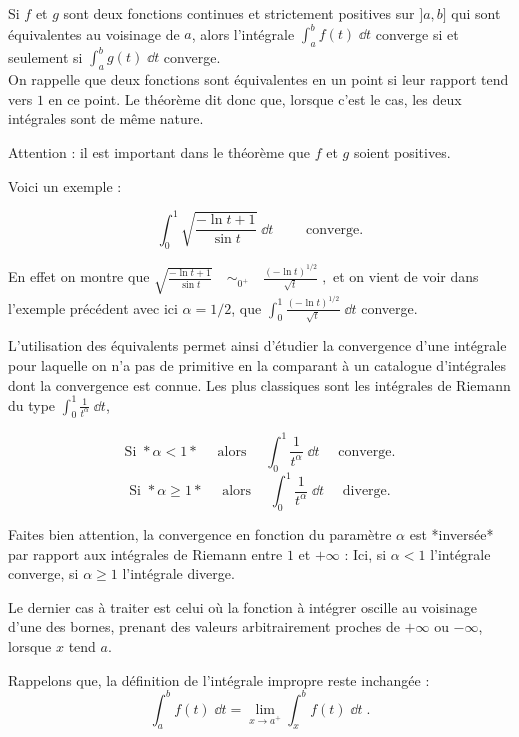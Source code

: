 Si $f$ et $g$ sont deux fonctions continues et strictement positives sur
$]a,b]$ qui sont équivalentes au voisinage de $a$, 
alors l'intégrale $\int_a^b f(t)\;\dd t$ 
converge si et seulement si  $\int_a^b g(t)\;\dd t$ converge. \\

On rappelle que deux fonctions sont équivalentes 
en un point si leur rapport tend vers $1$ en ce point.
Le théorème dit donc que, lorsque c'est le cas, les deux intégrales sont de même nature.

Attention : il est important dans le théorème 
que $f$ et $g$ soient positives.

\change
Voici un exemple :

$$\int_0^1 \sqrt{\frac{-\ln t+1}{\sin t}}\;\dd t\qquad\text{ converge.}$$

\change
En effet on montre que 
$\sqrt{\frac{-\ln t+1}{\sin t}} \quad\mathop{\sim}_{0^+}\quad
\frac{(-\ln t)^{1/2}}{\sqrt{t}}\;,$ 
et on vient de voir dans l'exemple précédent avec ici $\alpha=1/2$,
que 
$\int_0^1 \frac{(-\ln t)^{1/2}}{\sqrt{t}}\;\dd t$ converge.   


\diapo

L'utilisation des équivalents permet ainsi d'étudier la convergence d'une intégrale 
pour laquelle on n'a pas de primitive en la comparant à un catalogue d'intégrales 
dont la convergence est connue. Les plus classiques sont les intégrales de Riemann 
du type $\int_0^1 \frac{1}{t^\alpha}\;\dd t$, 

$$\text{Si } *\alpha < 1* \quad \text{ alors } \quad \int_0^1 \frac{1}{t^\alpha}\;\dd t
\quad\text{ converge.}$$
$$\text{Si } *\alpha \ge 1* \quad \text{ alors } \quad \int_0^1 \frac{1}{t^\alpha}\;\dd t
\quad\text{ diverge.}$$  

\change
Faites bien attention, la convergence en fonction du paramètre $\alpha$ est
*inversée* par rapport aux intégrales de Riemann entre $1$ et $+\infty$ :
Ici, si $\alpha < 1$ l'intégrale converge,
si $\alpha \ge 1$ l'intégrale diverge.


\diapo

Le dernier cas à traiter est celui où la fonction à intégrer
oscille au voisinage d'une des bornes, prenant des valeurs
arbitrairement proches de $+\infty$ ou $-\infty$, lorsque $x$ tend $a$.  

\change
Rappelons que, la définition de l'intégrale impropre reste inchangée :
$$\int_a^b f(t)\;\dd t = \lim_{x\rightarrow a^+} \int_x^b f(t)\;\dd t\;.$$

